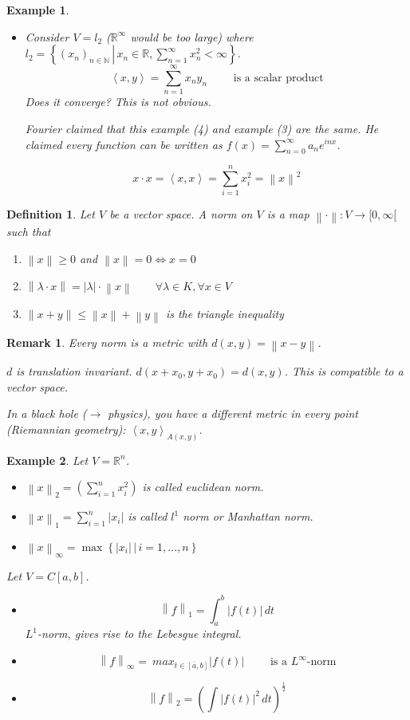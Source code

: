 \documentclass{article}
\newtheorem{example}{Example}  \numberwithin{example}{section}
\newtheorem{definition}{Definition}  \numberwithin{definition}{section}
\newtheorem{remark}{Remark}  \numberwithin{remark}{section}
\newcommand{\setdef}[2]{\left\{\left.#1\,\right|\,#2\right\}}
\newcommand{\angel}[1]{\left\langle#1\right\rangle}
\newcommand{\norm}[1]{\left\|#1\right\|}
\newcommand{\card}[1]{\left|#1\right|}
\begin{document}
\begin{example}
\begin{itemize}
    \item
      Consider $V = l_2$ ($\mathbb R^{\infty}$ would be too large) where $l_2 = \setdef{(x_n)_{n\in\mathbb N}}{x_n \in \mathbb R, \sum_{n=1}^\infty x_n^2 < \infty}$.
      \[ \angel{x, y} = \sum_{n=1}^\infty x_n y_n \qquad \text{ is a scalar product} \]
      Does it converge? This is not obvious.

      Fourier claimed that this example (4) and example (3) are the same.
      He claimed every function can be written as $f(x) = \sum_{n=0}^\infty a_n e^{inx}$.

      \[ x \cdot x = \angel{x, x} = \sum_{i=1}^n x_i^2 = \norm{x}^2 \]
  \end{itemize}
\end{example}

\begin{definition}
  Let $V$ be a vector space.
  A \emph{norm} on $V$ is a map $\norm{\cdot}: V \to [0,\infty[$
  such that
  \begin{enumerate}
    \item $\norm{x} \geq 0$ and $\norm{x} = 0 \iff x = 0$
    \item $\norm{\lambda \cdot x} = \card{\lambda} \cdot \norm{x} \qquad \forall \lambda \in K, \forall x \in V$
    \item $\norm{x + y} \leq \norm{x} + \norm{y}$ is the triangle inequality
  \end{enumerate}
\end{definition}

\begin{remark}
  Every norm is a metric with $d(x,y) = \norm{x - y}$.

  $d$ is translation invariant. $d(x + x_0, y + x_0) = d(x, y)$.
  This is compatible to a vector space.

  In a black hole ($\to$ physics), you have a different metric in every point (Riemannian geometry): $\angel{x,y}_{A(x,y)}$.
\end{remark}

\begin{example}
  Let $V = \mathbb R^n$.
  \begin{itemize}
    \item $\norm{x}_2 = \left(\sum_{i=1}^n x_i^2\right)$ is called \emph{euclidean norm}.
    \item $\norm{x}_1 = \sum_{i=1}^n \card{x_i}$ is called \emph{$l^1$ norm} or \emph{Manhattan norm}.
    \item $\norm{x}_{\infty} = \max\setdef{\card{x_i}}{i = 1, \dots, n}$
  \end{itemize}
  Let $V = C[a,b]$.
  \begin{itemize}
    \item \[ \norm{f}_1 = \int_a^b \card{f(t)} \, dt \]
      $L^1$-norm, gives rise to the Lebesgue integral.
    \item \[ \norm{f}_\infty =\ max_{t \in [\overline{a}, b]} \card{f(t)} \qquad \text{ is a $L^\infty$-norm} \]
    \item \[ \norm{f}_2 = \left(\int \card{f(t)}^2 \, dt \right)^{\frac12} \]
  \end{itemize}
\end{example}
\end{document}
